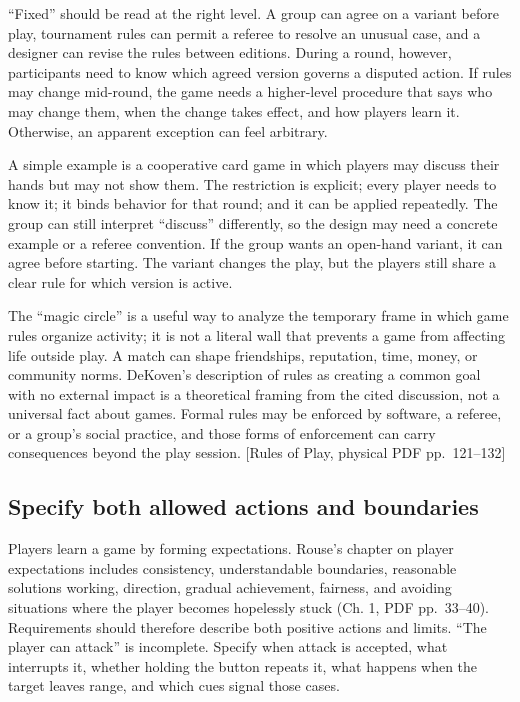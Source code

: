 ``Fixed'' should be read at the right level. A group can agree on a variant before play, tournament rules can permit a referee to resolve an unusual case, and a designer can revise the rules between editions. During a round, however, participants need to know which agreed version governs a disputed action. If rules may change mid-round, the game needs a higher-level procedure that says who may change them, when the change takes effect, and how players learn it. Otherwise, an apparent exception can feel arbitrary.

A simple example is a cooperative card game in which players may discuss their hands but may not show them. The restriction is explicit; every player needs to know it; it binds behavior for that round; and it can be applied repeatedly. The group can still interpret ``discuss'' differently, so the design may need a concrete example or a referee convention. If the group wants an open-hand variant, it can agree before starting. The variant changes the play, but the players still share a clear rule for which version is active.

The ``magic circle'' is a useful way to analyze the temporary frame in which game rules organize activity; it is not a literal wall that prevents a game from affecting life outside play. A match can shape friendships, reputation, time, money, or community norms. DeKoven's description of rules as creating a common goal with no external impact is a theoretical framing from the cited discussion, not a universal fact about games. Formal rules may be enforced by software, a referee, or a group's social practice, and those forms of enforcement can carry consequences beyond the play session. {[}Rules of Play, physical PDF pp.~121--132{]}

\subsection{Specify both allowed actions and boundaries}\label{05-engine-i-ch009-specify-both-allowed-actions-and-boundaries}

\hypertarget{05-engine-i-ch009-specify-both-allowed-actions-and-boundaries}{}

Players learn a game by forming expectations. Rouse's chapter on player expectations includes consistency, understandable boundaries, reasonable solutions working, direction, gradual achievement, fairness, and avoiding situations where the player becomes hopelessly stuck (Ch. 1, PDF pp.~33--40). Requirements should therefore describe both positive actions and limits. ``The player can attack'' is incomplete. Specify when attack is accepted, what interrupts it, whether holding the button repeats it, what happens when the target leaves range, and which cues signal those cases.

